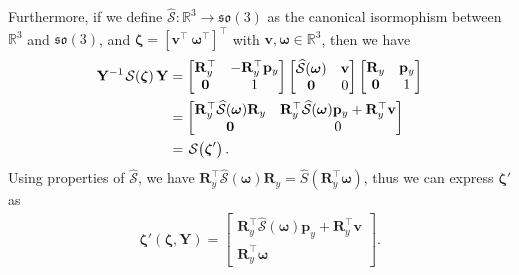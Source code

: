 Furthermore, if we define $\widehat{\mathcal{S}}:\mathbb{R}^3\to\mathfrak{so}(3)$ as the canonical isormophism between $\mathbb{R}^3$ and $\mathfrak{so}(3)$, and $\boldsymbol{\zeta}=[\mathbf{v}^\top\ \boldsymbol{\omega}^\top]^\top$ with $\mathbf{v}, \boldsymbol{\omega}\in\mathbb{R}^3$, then we have
\begin{align}
  \begin{split}
      \mathbf{Y}^{-1}\SL[\boldsymbol{\zeta}]\mathbf{Y} &= 
      \begin{bmatrix}
          \mathbf{R}_y^\top & -\mathbf{R}_y^\top\mathbf{p}_y\\
          \mathbf{0} & 1
      \end{bmatrix}
      \begin{bmatrix}
          \widehat{\mathcal{S}}(\boldsymbol{\omega}) & \mathbf{v}\\
          \mathbf{0} & 0
      \end{bmatrix}
      \begin{bmatrix}
          \mathbf{R}_y & \mathbf{p}_y\\
          \mathbf{0} & 1
      \end{bmatrix}\\
      &= 
      \begin{bmatrix}
          \mathbf{R}_y^\top\widehat{\mathcal{S}}(\boldsymbol{\omega})\mathbf{R}_y & \mathbf{R}_y^\top\widehat{\mathcal{S}}(\boldsymbol{\omega})\mathbf{p}_y + \mathbf{R}_y^\top\mathbf{v}\\
          \mathbf{0} & 0
      \end{bmatrix}\\
      &= \SL[\boldsymbol{\zeta}'].
  \end{split}
\end{align}
Using properties of $\widehat{\mathcal{S}}$, we have $\mathbf{R}_y^\top\widehat{\mathcal{S}}(\boldsymbol{\omega})\mathbf{R}_y = \widehat{S}(\mathbf{R}_y^\top\boldsymbol{\omega})$, thus we can express $\boldsymbol{\zeta}'$ as
\begin{align}
    \boldsymbol{\zeta}'(\boldsymbol{\zeta}, \mathbf{Y}) = \begin{bmatrix}
        \mathbf{R}_y^\top\widehat{\mathcal{S}}(\boldsymbol{\omega})\mathbf{p}_y + \mathbf{R}_y^\top\mathbf{v}\\
        \mathbf{R}_y^\top\boldsymbol{\omega}
    \end{bmatrix}.
\end{align}

